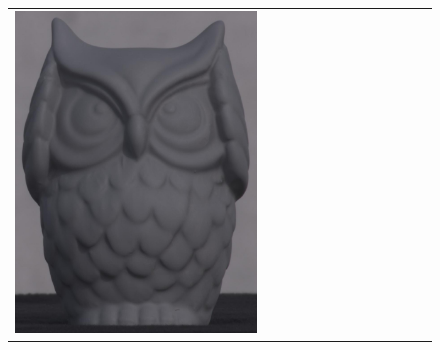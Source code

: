 \begin{figure}[!ht]
\begin{tabular}{@{}rcccccccccccc@{}}
    \includegraphics[width=\customwidth]{./figures/reconstruction/object/110346.jpg} &

\end{tabular}
\end{figure}
